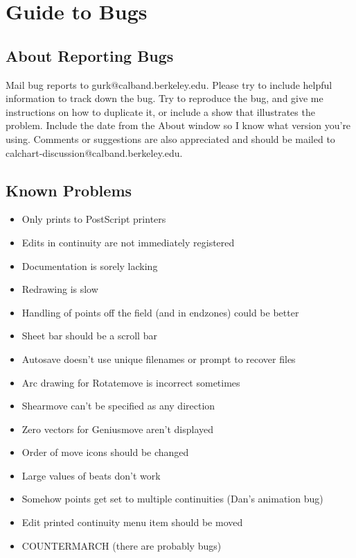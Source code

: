 \chapter{Guide to Bugs}\label{bugs}

\section{About Reporting Bugs}\label{reportingbugs}

Mail bug reports to gurk@calband.berkeley.edu.  Please try to include
helpful information to track down the bug.  Try to reproduce the bug,
and give me instructions on how to duplicate it, or include a show that
illustrates the problem.  Include the date from the About window so I
know what version you're using.  Comments or suggestions are also
appreciated and should be mailed to
calchart-discussion@calband.berkeley.edu.

\section{Known Problems}\label{problems}

\begin{itemize}\itemsep=0pt
\item Only prints to PostScript printers
\item Edits in continuity are not immediately registered
\item Documentation is sorely lacking
\item Redrawing is slow
\item Handling of points off the field (and in endzones) could be better
\item Sheet bar should be a scroll bar
\item Autosave doesn't use unique filenames or prompt to recover files
\item Arc drawing for Rotatemove is incorrect sometimes
\item Shearmove can't be specified as any direction
\item Zero vectors for Geniusmove aren't displayed
\item Order of move icons should be changed
\item Large values of beats don't work
\item Somehow points get set to multiple continuities (Dan's animation bug)
\item Edit printed continuity menu item should be moved
\item COUNTERMARCH (there are probably bugs)
\end{itemize}

